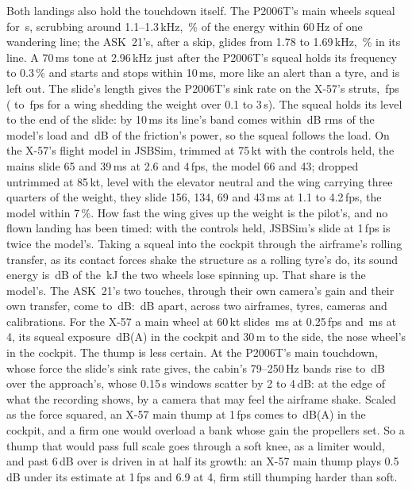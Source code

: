 \documentclass[10pt,a4paper,twocolumn]{article}
\begin{document}
Both landings also hold the touchdown itself. The P2006T's main wheels squeal for \NTdSlide\,s, scrubbing around 1.1--1.3\,kHz, \NTdToneP\,\% of the energy within 60\,Hz of one wandering line; the ASK~21's, after a skip, glides from 1.78 to 1.69\,kHz, \NTdToneA\,\% in its line. A 70\,ms tone at 2.96\,kHz just after the P2006T's squeal holds its frequency to 0.3\,\% and starts and stops within 10\,ms, more like an alert than a tyre, and is left out. The slide's length gives the P2006T's sink rate on the X-57's struts, \NTdSink\,fps (\NTdSinkLo{} to \NTdSinkHi\,fps for a wing shedding the weight over 0.1 to 3\,s). The squeal holds its level to the end of the slide: by 10\,ms its line's band comes within \NTdEnvLoad\,dB rms of the model's load and \NTdEnvPower\,dB of the friction's power, so the squeal follows the load. On the X-57's flight model in JSBSim, trimmed at 75\,kt with the controls held, the mains slide 65 and 39\,ms at 2.6 and 4\,fps, the model 66 and 43; dropped untrimmed at 85\,kt, level with the elevator neutral and the wing carrying three quarters of the weight, they slide 156, 134, 69 and 43\,ms at 1.1 to 4.2\,fps, the model within 7\,\%. How fast the wing gives up the weight is the pilot's, and no flown landing has been timed: with the controls held, JSBSim's slide at 1\,fps is twice the model's. Taking a squeal into the cockpit through the airframe's rolling transfer, as its contact forces shake the structure as a rolling tyre's do, its sound energy is \NTdEffP\,dB of the \NTdLost\,kJ the two wheels lose spinning up. That share is the model's. The ASK~21's two touches, through their own camera's gain and their own transfer, come to \NTdEffA\,dB: \NTdEffDiff\,dB apart, across two airframes, tyres, cameras and calibrations. For the X-57 a main wheel at 60\,kt slides \NTdSlideSoft\,ms at 0.25\,fps and \NTdSlideFirm\,ms at 4, its squeal exposure \NTdSqCock\,dB(A) in the cockpit and \NTdSqSide{} 30\,m to the side, the nose wheel's \NTdSqNose{} in the cockpit. The thump is less certain. At the P2006T's main touchdown, whose force the slide's sink rate gives, the cabin's 79--250\,Hz bands rise \NTdRiseLo{} to \NTdRiseHi\,dB over the approach's, whose 0.15\,s windows scatter by 2 to 4\,dB: at the edge of what the recording shows, by a camera that may feel the airframe shake. Scaled as the force squared, an X-57 main thump at 1\,fps comes to \NTdThump\,dB(A) in the cockpit, and a firm one would overload a bank whose gain the propellers set. So a thump that would pass full scale goes through a soft knee, as a limiter would, and past 6\,dB over is driven in at half its growth: an X-57 main thump plays 0.5\,dB under its estimate at 1\,fps and 6.9 at 4, firm still thumping harder than soft.
\end{document}
